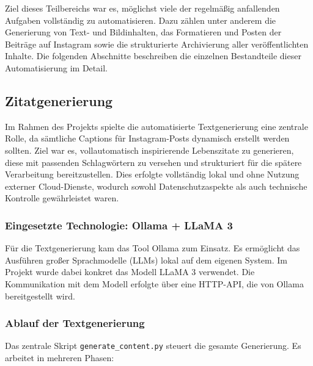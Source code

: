\documentclass[a4paper,12pt]{article}
\begin{document}
Ziel dieses Teilbereichs war es, möglichst viele der regelmäßig anfallenden Aufgaben vollständig zu automatisieren. Dazu zählen unter anderem die Generierung von Text- und Bildinhalten, das Formatieren und Posten der Beiträge auf Instagram sowie die strukturierte Archivierung aller veröffentlichten Inhalte. Die folgenden Abschnitte beschreiben die einzelnen Bestandteile dieser Automatisierung im Detail.

\subsection{Zitatgenerierung}

Im Rahmen des Projekts spielte die automatisierte Textgenerierung eine zentrale Rolle, da sämtliche Captions für Instagram-Posts dynamisch erstellt werden sollten. Ziel war es, vollautomatisch inspirierende Lebenszitate zu generieren, diese mit passenden Schlagwörtern zu versehen und strukturiert für die spätere Verarbeitung bereitzustellen. Dies erfolgte vollständig lokal und ohne Nutzung externer Cloud-Dienste, wodurch sowohl Datenschutzaspekte als auch technische Kontrolle gewährleistet waren.

\subsubsection*{Eingesetzte Technologie: Ollama + LLaMA 3}

Für die Textgenerierung kam das Tool Ollama zum Einsatz. Es ermöglicht das Ausführen großer Sprachmodelle (LLMs) lokal auf dem eigenen System. Im Projekt wurde dabei konkret das Modell LLaMA 3 verwendet. Die Kommunikation mit dem Modell erfolgte über eine HTTP-API, die von Ollama bereitgestellt wird.

\subsubsection*{Ablauf der Textgenerierung}

Das zentrale Skript \texttt{generate\_content.py} steuert die gesamte Generierung. Es arbeitet in mehreren Phasen:
\end{document}
